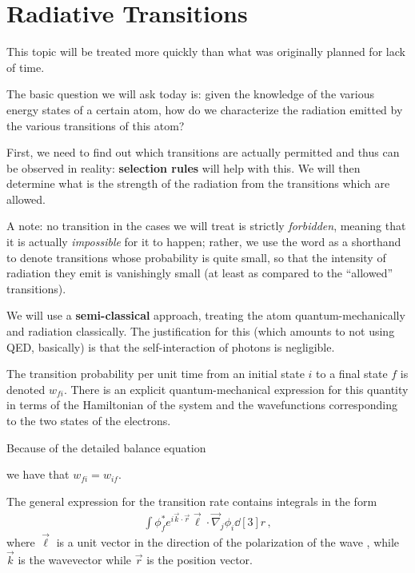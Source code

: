 \documentclass[main.tex]{subfiles}
\begin{document}
\section{Radiative Transitions}


This topic will be treated more quickly than what was originally planned for lack of time. 

The basic question we will ask today is: given the knowledge of the various energy states of a certain atom, how do we characterize the radiation emitted by the various transitions of this atom? 

First, we need to find out which transitions are actually permitted and thus can be observed in reality: \textbf{selection rules} will help with this. We will then determine what is the strength of the radiation from the transitions which are allowed. 

A note: no transition in the cases we will treat is strictly \emph{forbidden}, meaning that it is actually \emph{impossible} for it to happen; rather, we use the word as a shorthand to denote transitions whose probability is quite small, so that the intensity of radiation they emit is vanishingly small (at least as compared to the ``allowed'' transitions). 

We will use a \textbf{semi-classical} approach, treating the atom quantum-mechanically and radiation classically. 
The justification for this (which amounts to not using QED, basically) is that the self-interaction of photons is negligible. 


The transition probability per unit time from an initial state \(i\) to a final state \(f\) is denoted \(w_{fi}\).
There is an explicit quantum-mechanical expression for this quantity in terms of the Hamiltonian of the system and the wavefunctions corresponding to the two states of the electrons. 

Because of the detailed balance equation 


we have that \(w_{fi} = w_{if}\). 

The general expression for the transition rate contains integrals in the form 
%
\begin{align}
\int \phi _f^{*} e^{i \vec{k} \cdot \vec{r}} \vec{\ell} \cdot \vec{\nabla}_j \phi _i \dd[3]{r}
\,,
\end{align}
%
where \(\vec{\ell}\) is a unit vector in the direction of the polarization of the wave \cite[eq.\ 10.13 onwards]{rybickiRadiativeProcessesAstrophysics1979}, while \(\vec{k}\) is the wavevector while \(\vec{r}\) is the position vector.
\end{document}
